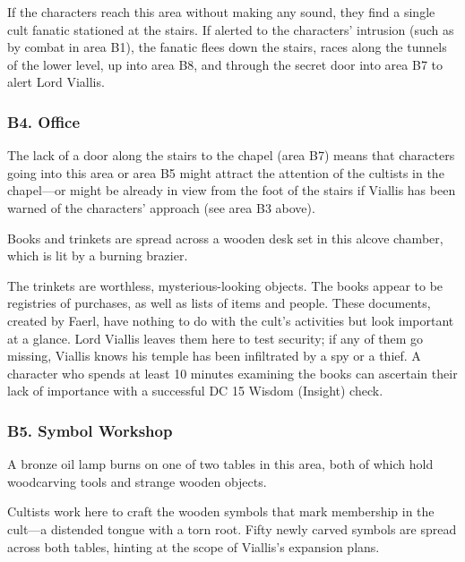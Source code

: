 \documentclass[10pt,a4paper,twoside,bg=print,twocolumn,openany,nodeprecatedcode]{dndbook}
\begin{document}
If the characters reach this area without making any sound, they find a single cult fanatic stationed at the stairs. If alerted to the characters' intrusion (such as by combat in area B1), the fanatic flees down the stairs, races along the tunnels of the lower level, up into area B8, and through the secret door into area B7 to alert Lord Viallis.

\subsubsection{B4. Office}
The lack of a door along the stairs to the chapel (area B7) means that characters going into this area or area B5 might attract the attention of the cultists in the chapel—or might be already in view from the foot of the stairs if Viallis has been warned of the characters' approach (see area B3 above).

\begin{DndReadAloud}{}
Books and trinkets are spread across a wooden desk set in this alcove chamber, which is lit by a burning brazier.

\end{DndReadAloud}

The trinkets are worthless, mysterious-looking objects. The books appear to be registries of purchases, as well as lists of items and people. These documents, created by Faerl, have nothing to do with the cult's activities but look important at a glance. Lord Viallis leaves them here to test security; if any of them go missing, Viallis knows his temple has been infiltrated by a spy or a thief. A character who spends at least 10 minutes examining the books can ascertain their lack of importance with a successful DC 15 Wisdom (Insight) check.

\subsubsection{B5. Symbol Workshop}
\begin{DndReadAloud}{}
A bronze oil lamp burns on one of two tables in this area, both of which hold woodcarving tools and strange wooden objects.

\end{DndReadAloud}

Cultists work here to craft the wooden symbols that mark membership in the cult—a distended tongue with a torn root. Fifty newly carved symbols are spread across both tables, hinting at the scope of Viallis's expansion plans.
\end{document}

